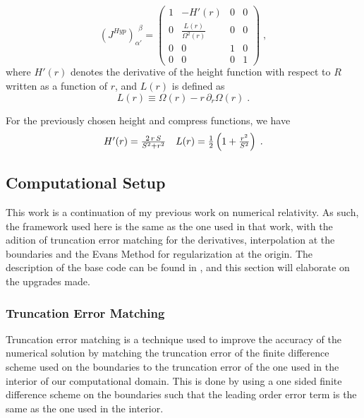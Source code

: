 \begin{equation}
    \left(J^{Hyp}\right)_{\alpha'}^{\ \ \beta} = 
    \begin{pmatrix}
        1 & -H'(r) & 0 & 0 \\
        0 & \frac{L(r)}{\Omega^2(r)} & 0 & 0 \\
        0 & 0 & 1 & 0 \\
        0 & 0 & 0 & 1
    \end{pmatrix} \; ,
\end{equation}
%
where $H'(r)$ denotes the derivative of the height function with respect to $R$ written as a function of $r$, and $L(r)$ is defined as
%
\begin{equation}
    L(r) \equiv \Omega(r) - r \, \partial_r \Omega(r) \; .
\end{equation}

For the previously chosen height and compress functions, we have
%
\begin{equation}
    \begin{array}{c c}
        H'(r) = \frac{2 \, r \, S}{S^2 + r^2} & L(r) = \frac{1}{2} \left(1 + \frac{r^2}{S^2}\right) \; .
    \end{array}
\end{equation}


\subsection{Computational Setup}

This work is a continuation of my previous work on numerical relativity. As such, the framework used here is the same as the one used in that work, with the adition of truncation error matching for the derivatives, interpolation at the boundaries and the Evans Method for regularization at the origin. The description of the base code can be found in \cite{}, and this section will elaborate on the upgrades made.

\subsubsection{Truncation Error Matching}

Truncation error matching is a technique used to improve the accuracy of the numerical solution by matching the truncation error of the finite difference scheme used on the boundaries to the truncation error of the one used in the interior of our computational domain. This is done by using a one sided finite difference scheme on the boundaries such that the leading order error term is the same as the one used in the interior.

